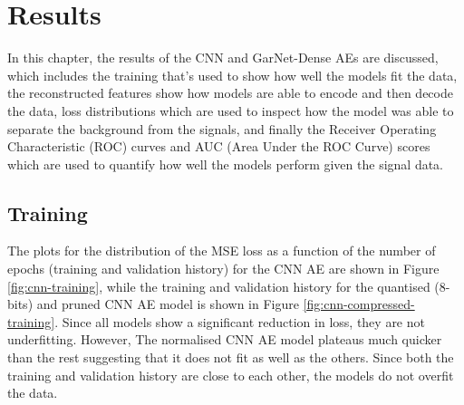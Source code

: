 \documentclass[a4paper]{article}
\theoremstyle{plain}
\theoremstyle{definition}
\begin{document}
    
    \section{Results}
    \label{section:results}

        In this chapter, the results of the CNN and GarNet-Dense AEs are discussed, which includes the training that's used to show how well the models fit the data, the reconstructed features show how models are able to encode and then decode the data, loss distributions which are used to inspect how the model was able to separate the background from the signals, and finally the Receiver Operating Characteristic (ROC) curves and AUC (Area Under the ROC Curve) scores which are used to quantify how well the models perform given the signal data.

        \subsection{Training}
            
            The plots for the distribution of the MSE loss as a function of the number of epochs (training and validation history) for the CNN AE are shown in Figure \ref{fig:cnn-training}, while the training and validation history for the quantised (8-bits) and pruned CNN AE model is shown in Figure \ref{fig:cnn-compressed-training}. Since all models show a significant reduction in loss, they are not underfitting. However, The normalised CNN AE model plateaus much quicker than the rest suggesting that it does not fit as well as the others. Since both the training and validation history are close to each other, the models do not overfit the data.
\end{document}
